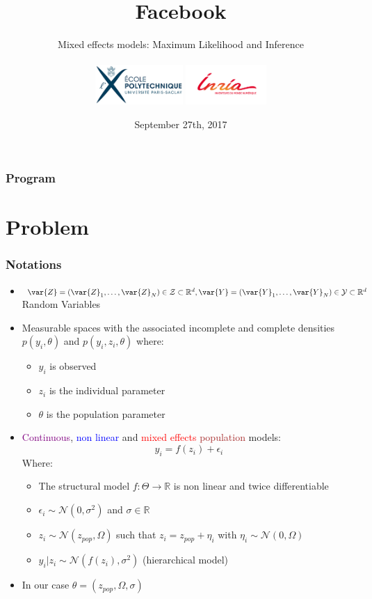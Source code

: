 \documentclass[xcolor={dvipsnames}]{beamer}
\title{Facebook}
\subtitle{Mixed effects models: Maximum Likelihood and Inference\\~\\
\includegraphics[height=1.5cm]{logo_x}
\includegraphics[height=1.5cm]{logo_inria}}
\institute[]{Belhal Karimi, Marc Lavielle, Eric Moulines}
\date{September 27th, 2017}
\begin{document}
\begin{frame}
\titlepage
\end{frame}

\begin{frame}
\frametitle{Program}
\tableofcontents
\end{frame}




\section{Problem}

\begin{frame}
\frametitle{Notations}

\begin{itemize}
\item $\var{Z} = (\var{Z}_1,\dots,\var{Z}_N) \in \mathcal{Z} \subset \mathbb{R}^d, \var{Y} = (\var{Y}_1,\dots,\var{Y}_N) \in \mathcal{Y} \subset \mathbb{R}^d$ Random Variables
\item Measurable spaces with the associated incomplete and complete densities $p(y_i,\theta)$ and $p(y_i,z_i,\theta)$ where:
\begin{itemize}
  \item $y_i$ is observed
  \item $z_i$ is the individual parameter
  \item $\theta$ is the population parameter
\end{itemize}
\item \textcolor{purple}{Continuous}, \textcolor{blue}{non linear} and \textcolor{red}{mixed effects} \textcolor{brown}{population} models:
\begin{equation}
y_{i} = f(z_{i}) + \epsilon_i
\end{equation}
Where:
\begin{itemize}
  \item The structural model $f: \Theta \to \mathbb{R}$ is non linear and twice differentiable
  \item $\epsilon_i \sim \mathcal{N}(0,\sigma^2)$ and $\sigma \in \mathbb{R}$
  \item $z_i \sim \mathcal{N}(z_{pop},\Omega)$ such that $z_i = z_{pop} + \eta_i$ with $\eta_i \sim \mathcal{N}(0,\Omega)$
  \item $y_i | z_i \sim \mathcal{N}(f(z_i),\sigma^2)$ (hierarchical model)
\end{itemize}
\item In our case $\theta = (z_{pop}, \Omega, \sigma )$

\end{itemize}

\end{frame}
\end{document}

